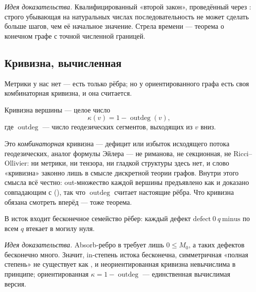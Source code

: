 \emph{Идея доказательства.} Квалифицированный «второй закон», проведённый через
: строго убывающая на натуральных числах последовательность не
может сделать больше шагов, чем её начальное значение. Стрела времени --- теорема о конечном графе с
точной численной границей.

\subsection{Кривизна, вычисленная}

Метрики у нас нет --- есть только рёбра; но у ориентированного графа есть своя комбинаторная кривизна,
и она считается.

\begin{definition}\label{def:curvature}
Кривизна вершины --- целое число
\begin{equation}\label{eq:curvature}
\kappa(v) = 1 - \operatorname{outdeg}(v),
\end{equation}
где $\operatorname{outdeg}$ --- число геодезических сегментов, выходящих из $v$ вниз.
\end{definition}

Это \emph{комбинаторная} кривизна --- дефицит или избыток исходящего потока геодезических, аналог
формулы Эйлера --- не риманова, не секционная, не Ricci--Ollivier: ни метрики, ни тензора, ни гладкой
структуры здесь нет, и слово «кривизна» законно лишь в смысле дискретной теории графов. Внутри этого
смысла всё честно: out-множество каждой вершины предъявлено как  и доказано совпадающим с
 (), так что $\operatorname{outdeg}$ считает настоящие рёбра. Что
кривизна обязана смотреть вперёд --- тоже теорема.

\begin{theorem}\label{thm:inDegree_infinite_at_origin}
\green{} В исток  входит бесконечное семейство рёбер: каждый дефект
$\mathrm{defect}\ 0\ q\ \mathrm{minus}$ по всем $q$ втекает в могилу нуля.
\end{theorem}

\emph{Идея доказательства.} Absorb-ребро в  требует лишь $0 \le M_0$, а таких
дефектов бесконечно много. Значит, in-степень истока бесконечна, симметричная «полная степень» не
существует как , и неориентированная кривизна невычислима в принципе; ориентированная
$\kappa = 1 - \operatorname{outdeg}$ --- единственная вычислимая версия.

